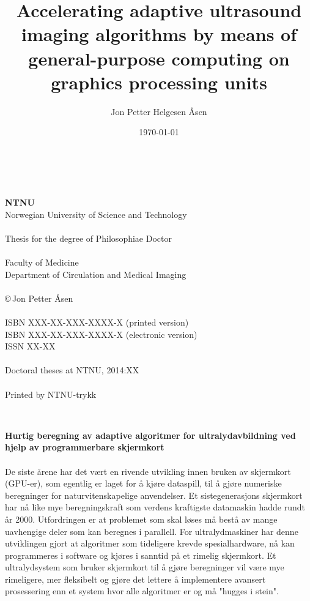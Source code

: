 \documentclass[10pt,b5paper,twoside]{book}
\author{Jon Petter Helgesen \AA{}sen}
\title{%
Accelerating adaptive ultrasound imaging algorithms by means of general-purpose computing on graphics processing units 
\vspace{0.5cm}}
\begin{document}
\date{\today}
\pagestyle{empty} \maketitle

\newpage%

\renewcommand{\thepage}{\roman{page}}%

~\\
\vspace{10.0cm}
~\\
{\bf NTNU}
\\
Norwegian University of Science and Technology\\
\\
Thesis for the degree of Philosophiae Doctor\\
\\
Faculty of Medicine\\
Department of Circulation and Medical Imaging\\
\\
\copyright\,Jon Petter \AA{}sen\\
\\
ISBN XXX-XX-XXX-XXXX-X (printed version)\\
ISBN XXX-XX-XXX-XXXX-X (electronic version)\\
ISSN XX-XX\\
\\
Doctoral theses at NTNU, 2014:XX\\
\\
Printed by NTNU-trykk

~\\
\newpage


\noindent\large 
\textbf{Hurtig beregning av adaptive algoritmer for ultralydavbildning ved hjelp av programmerbare skjermkort}
\\\\%
\normalsize
De siste årene har det vært en rivende utvikling innen bruken av skjermkort (GPU-er), som egentlig er laget for å kjøre dataspill, til å gjøre numeriske beregninger for naturvitenskapelige anvendelser. Et sistegenerasjons skjermkort har nå like mye beregningskraft som verdens kraftigste datamaskin hadde rundt år 2000. Utfordringen er at problemet som skal løses må bestå av mange uavhengige deler som kan beregnes i parallell.  For ultralydmaskiner har denne utviklingen gjort at algoritmer som tideligere krevde spesialhardware, nå kan programmeres i software og kjøres i sanntid på et rimelig skjermkort. Et ultralydsystem som bruker skjermkort til å gjøre beregninger vil være mye rimeligere, mer fleksibelt og gjøre det lettere å implementere avansert prosessering enn et system hvor alle algoritmer er og må "hugges i stein".
\end{document}
